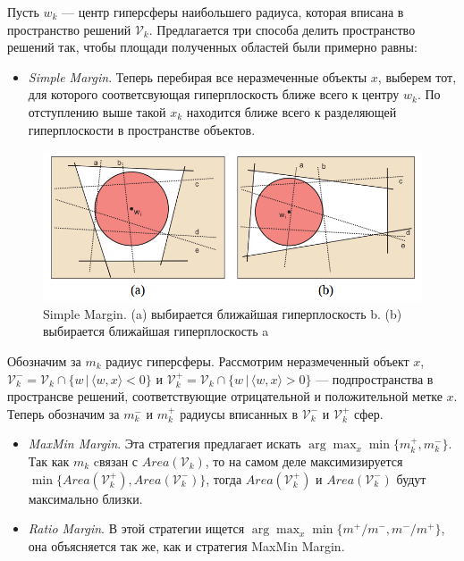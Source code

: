\documentclass[specialist, 12pt, href]{article}
\begin{document}
Пусть \(w_k\) --- центр гиперсферы наибольшего радиуса, которая вписана
в пространство решений \(\mathcal{V}_k\). Предлагается три способа
делить пространство решений так, чтобы площади полученных областей были
примерно равны:

\begin{itemize}
\item
  \emph{Simple Margin}. Теперь перебирая все неразмеченные объекты
  \(x\), выберем тот, для которого соответсвующая гиперплоскость ближе
  всего к центру \(w_k\). По отступлению выше такой \(x_k\) находится
  ближе всего к разделяющей гиперплоскости в пространстве объектов.
\end{itemize}

\begin{figure}[htbp]
\centering
\includegraphics[width=5in]{img/simplemargin.png}
\caption{Simple Margin. (a) выбирается ближайшая гиперплоскость
b. (b) выбирается ближайшая гиперплоскость a}
\end{figure}

Обозначим за \(m_k\) радиус гиперсферы. Рассмотрим неразмеченный объект
\(x\), 
\(\mathcal{V}_k^- = \mathcal{V}_k \cap \{w\,|\, \langle w, x\rangle < 0\}\)
и
\(\mathcal{V}_k^+ = \mathcal{V}_k \cap \{w\,|\, \langle w, x\rangle > 0\}\) --- подпространства в
пространсве решений, соответствующие отрицательной и положительной метке
\(x\). Теперь обозначим за \(m^-_k\) и \(m^+_k\) радиусы вписанных в
\(\mathcal{V}_k^-\) и \(\mathcal{V}_k^+\) сфер.


\begin{itemize}
\item
  \emph{MaxMin Margin}. Эта стратегия предлагает искать
  \(\arg\max_x \min\{m^+_k, m^-_k\}\). Так как \(m_k\) cвязан с
  \(Area(\mathcal{V}_k)\), то на самом деле максимизируется
  \(\min\{Area(\mathcal{V}_k^+), Area(\mathcal{V}^-_k)\}\), тогда
  \(Area(\mathcal{V}_k^+)\) и \(Area(\mathcal{V}^-_k)\) будут
  максимально близки.
\item
  \emph{Ratio Margin}. В этой стратегии ищется
  \(\arg\max_x \min\{m^+/m^-, m^-/m^+\}\), она объясняется так же, как и
  стратегия MaxMin Margin.
\end{itemize}
\end{document}
